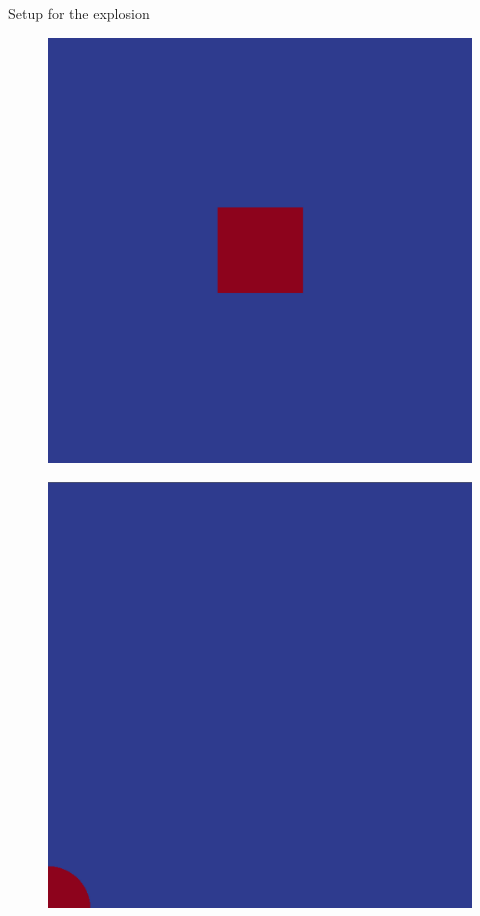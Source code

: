 \begin{frame}{Setup for the explosion}
\begin{minipage}{0.3\textwidth}
\begin{block}{}
\begin{figure}
        	  						\centering
        	  						\includegraphics[width=\textwidth]{../../figs/exp/sqr}
        	  					\end{figure}
        	  		  	\end{block}
        	  	\end{minipage}
				\begin{minipage}{0.3\textwidth}
        	  			\begin{block}{}
        	  			\vspace{-1.7cm}
        	  				\begin{figure}
        	  						\centering
        	  						\includegraphics[width=\textwidth]{../../figs/exp/corner}

\end{figure}
\end{block}
\end{minipage}
\end{frame}
